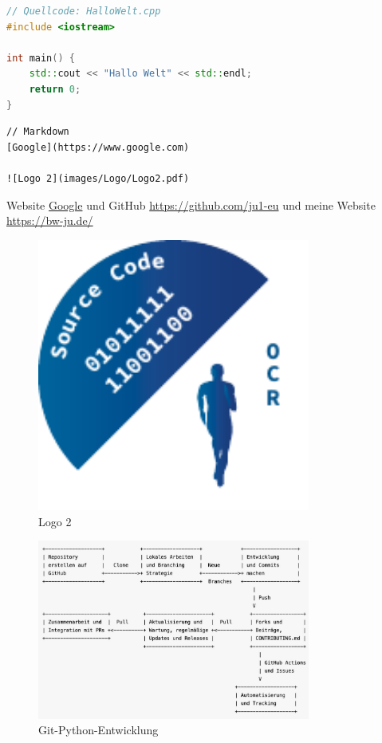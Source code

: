 \documentclass{vorlage-design-main}
\begin{document}
\newpage

\begin{lstlisting}[language={C++}]
// Quellcode: HalloWelt.cpp
#include <iostream>

int main() {
    std::cout << "Hallo Welt" << std::endl;
    return 0;
}
\end{lstlisting}

\begin{lstlisting}
// Markdown
[Google](https://www.google.com)

![Logo 2](images/Logo/Logo2.pdf)
\end{lstlisting}

Website \href{https://www.google.com}{Google} und GitHub
\url{https://github.com/ju1-eu} und meine Website
\url{https://bw-ju.de/}

\begin{figure}
\centering
\includegraphics[width=0.8\textwidth]{images/Logo/Logo2.pdf}
\caption{Logo 2}
\end{figure}

\begin{figure}
\centering
\includegraphics[width=0.8\textwidth]{images/Git-Python-Entwicklung.pdf}
\caption{Git-Python-Entwicklung}
\end{figure}


\clearpage
\printbibliography
\end{document}
